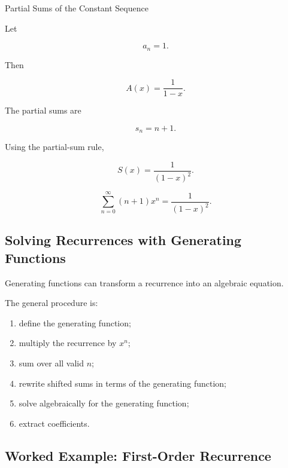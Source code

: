 \begin{workedexamplebox}{Partial Sums of the Constant Sequence}

Let

\[
a_n=1.
\]

Then

\[
A(x)=\frac{1}{1-x}.
\]

The partial sums are

\[
s_n=n+1.
\]

Using the partial-sum rule,

\[
S(x)
=
\frac{1}{(1-x)^2}.
\]

\begin{answerbox}
\[
\boxed{
\sum_{n=0}^{\infty}(n+1)x^n
=
\frac{1}{(1-x)^2}.
}
\]
\end{answerbox}

\end{workedexamplebox}

\subsection{Solving Recurrences with Generating Functions}
\label{subsec:solving-recurrences-gf}

Generating functions can transform a recurrence into an algebraic
equation.

The general procedure is:

\begin{enumerate}
    \item define the generating function;
    \item multiply the recurrence by \(x^n\);
    \item sum over all valid \(n\);
    \item rewrite shifted sums in terms of the generating function;
    \item solve algebraically for the generating function;
    \item extract coefficients.
\end{enumerate}

\subsection{Worked Example: First-Order Recurrence}
\label{subsec:worked-gf-first-order}

